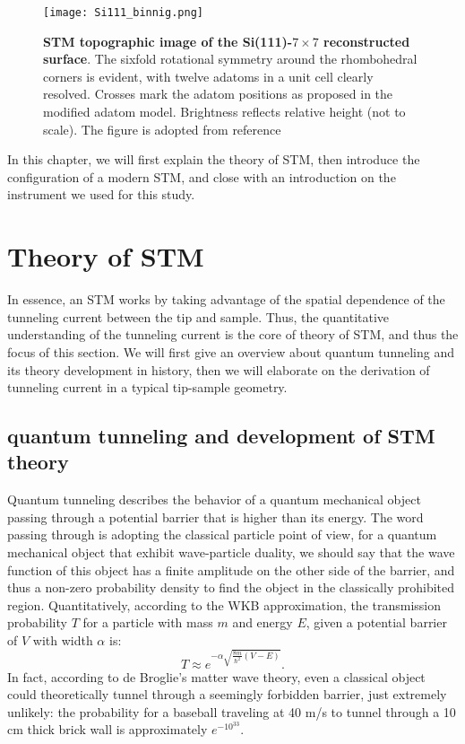\begin{figure}
	\centering
	\texttt{[image: Si111\_binnig.png]}
	\caption[\textbf{STM topographic image of the Si(111)-$7 \times 7$ reconstructed surface}]{\textbf{STM topographic image of the Si(111)-$7 \times 7$ reconstructed surface}. The sixfold rotational symmetry around the rhombohedral corners is evident, with twelve adatoms in a unit cell clearly resolved. Crosses mark the adatom positions as proposed in the modified adatom model. Brightness reflects relative height (not to scale). The figure is adopted from reference \cite{binnig77Reconstruction1983}}
	\label{figure:si111_binnig}
\end{figure}

In this chapter, we will first explain the theory of \ac{STM}, then introduce the configuration of a modern \ac{STM}, and close with an introduction on the instrument we used for this study. 

\section{Theory of STM}
In essence, an \ac{STM} works by taking advantage of the spatial dependence of the tunneling current between the tip and sample. Thus, the quantitative understanding of the tunneling current is the core of theory of \ac{STM}, and thus the focus of this section. We will first give an overview about quantum tunneling and its theory development in history, then we will elaborate on the derivation of tunneling current in a typical tip-sample geometry.

\subsection{quantum tunneling and development of STM theory}
Quantum tunneling describes the behavior of a quantum mechanical object passing through a potential barrier that is higher than its energy. The word passing through is adopting the classical particle point of view, for a quantum mechanical object that exhibit wave-particle duality, we should say that the wave function of this object has a finite amplitude on the other side of the barrier, and thus a non-zero probability density to find the object in the classically prohibited region. Quantitatively, according to the WKB approximation, the transmission probability $T$ for a particle with mass $m$ and energy $E$, given a potential barrier of $V$ with width $\alpha$ is: 
\begin{equation}
	T \approx e^{-\alpha\sqrt{\frac{8m}{\hslash^2}(V-E)}}. 
\end{equation}
In fact, according to de Broglie's  matter wave theory, even a classical object could theoretically tunnel through a seemingly forbidden barrier, just extremely unlikely: the probability for a baseball traveling at 40 m/s to tunnel through a 10 cm thick brick wall is approximately $e^{-10^{33}}$. 

